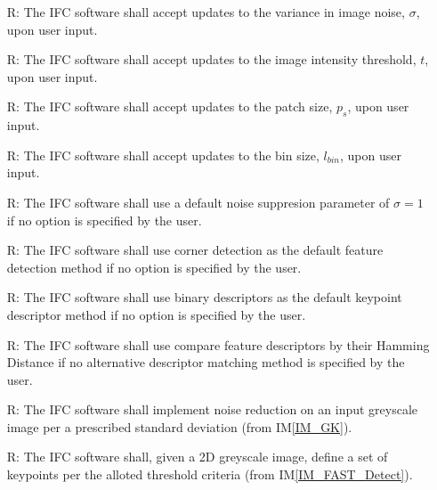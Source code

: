 \documentclass[12pt]{article}
\newcommand{\iref}[1]{IM\ref{#1}}
\newcounter{reqnum} %
\begin{document}
\noindent \begin{itemize}

\item[R\refstepcounter{reqnum}\thereqnum \label{R_Update_SD}:] The IFC software shall accept 
updates to the variance in image noise,  $\mathit{\sigma}$, upon user input.

\item[R\refstepcounter{reqnum}\thereqnum \label{R_Update_Intensity}:] The IFC software shall accept 
updates to the image intensity threshold, $\mathit{t}$, upon user input.

\item[R\refstepcounter{reqnum}\thereqnum \label{R_Update_Patch}:] The IFC software shall accept 
updates to the patch size, $\mathit{p_{s}}$, upon user input.

\item[R\refstepcounter{reqnum}\thereqnum \label{R_Update_BinSize}:] The IFC software shall accept 
updates to the bin size, $\mathit{l_{bin}}$, upon user input.

\item[R\refstepcounter{reqnum}\thereqnum \label{R_Default_Noise}:] The IFC software shall use a 
default noise suppresion parameter of $\sigma = 1$ if no option is specified by the user.

\item[R\refstepcounter{reqnum}\thereqnum \label{R_Default_FD}:] The IFC software shall use corner 
detection as the default feature detection method if no option is specified by the user.

\item[R\refstepcounter{reqnum}\thereqnum \label{R_Default_KD}:] The IFC software shall use binary 
descriptors as the default keypoint descriptor method if no option is specified by the user.

\item[R\refstepcounter{reqnum}\thereqnum \label{R_Default_FM}:] The IFC software shall use compare 
feature descriptors by their Hamming Distance if no alternative descriptor matching method 
is specified by the user.

\item[R\refstepcounter{reqnum}\thereqnum \label{R_NoiseReduction}:] The IFC software shall 
implement noise reduction on an input greyscale image per a prescribed standard deviation (from 
\iref{IM_GK}).

\item[R\refstepcounter{reqnum}\thereqnum \label{R_DetectKeypoints}:] The IFC software shall, given a 2D 
greyscale image, define a set of keypoints per the alloted threshold criteria (from 
\iref{IM_FAST_Detect}).


\end{itemize}
\end{document}
